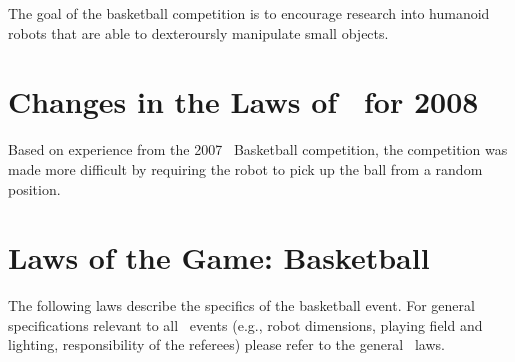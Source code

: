 \documentclass[12pt]{hurocup}
\begin{document}
The goal of the basketball competition is to encourage research into
humanoid robots that are able to dexteroursly manipulate small
objects.

\section{Changes in the Laws of \HuroCup\ for 2008}

Based on experience from the 2007 \HuroCup\ Basketball competition,
the competition was made more difficult by requiring the robot to pick
up the ball from a random position.

\section{Laws of the Game: Basketball}
\label{sec:basketball-laws}

The following laws describe the specifics of the basketball
event. For general specifications relevant to all \HuroCup\ events
(e.g., robot dimensions, playing field and lighting, responsibility of
the referees) please refer to the general \HuroCup\ laws.

\label{bb-field}
\end{document}
